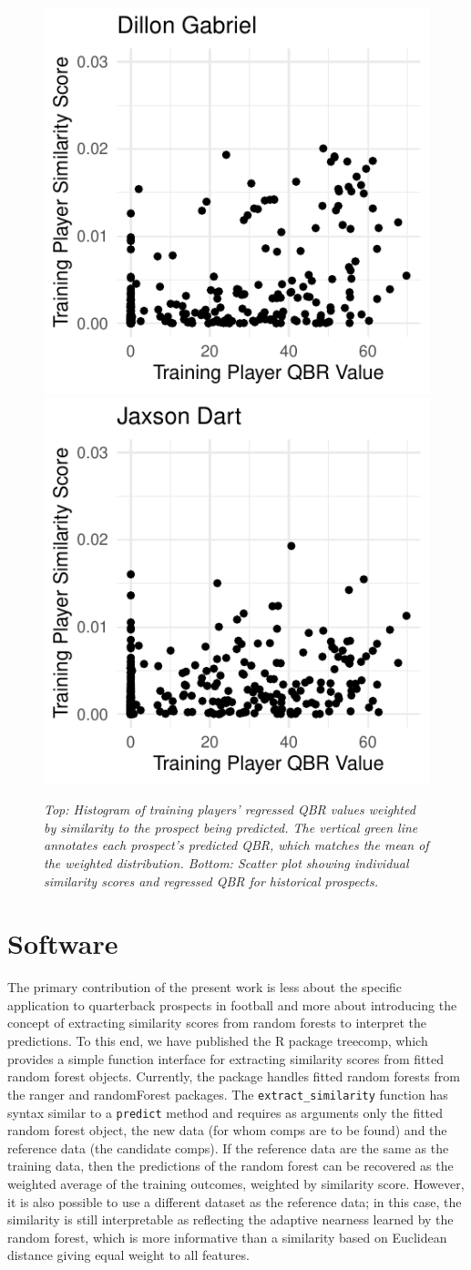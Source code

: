 \documentclass[Review, sageh, times]{sagej}
\begin{document}
\begin{figure}[h]
    \includegraphics[width=0.24\linewidth]{prospect_similarity_gabriel.pdf}
    \includegraphics[width=0.24\linewidth]{prospect_similarity_dart.pdf}
    \caption{\it Top: Histogram of training players' regressed QBR values weighted by similarity to the prospect being predicted. The vertical green line annotates each prospect's predicted QBR, which matches the mean of the weighted distribution. Bottom: Scatter plot showing individual similarity scores and regressed QBR for historical prospects.}
    \label{fig:prospect-plots}
\end{figure}

\section{Software}
\label{sec:software}

The primary contribution of the present work is less about the specific application to quarterback prospects in football and more about introducing the concept of extracting similarity scores from random forests to interpret the predictions. To this end, we have published the R package treecomp, which provides a simple function interface for extracting similarity scores from fitted random forest objects. Currently, the package handles fitted random forests from the ranger and randomForest packages. The \texttt{extract\_similarity} function has syntax similar to a \texttt{predict} method and requires as arguments only the fitted random forest object, the new data (for whom comps are to be found) and the reference data (the candidate comps). If the reference data are the same as the training data, then the predictions of the random forest can be recovered as the weighted average of the training outcomes, weighted by similarity score. However, it is also possible to use a different dataset as the reference data; in this case, the similarity is still interpretable as reflecting the adaptive nearness learned by the random forest, which is more informative than a similarity based on Euclidean distance giving equal weight to all features.
\end{document}
